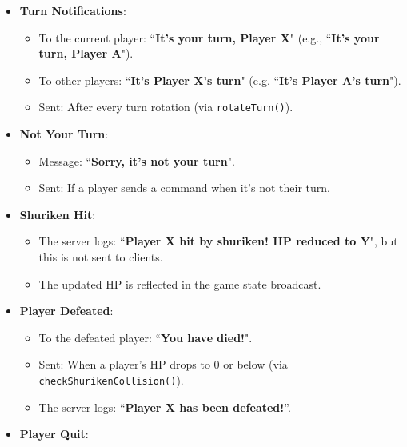 \documentclass{article}
\begin{document}
\begin{enumerate}
\begin {itemize}
\begin{itemize}
\begin{verbatim}
ACTIVE PLAYER INFO (IF EXISTS)
Player 0
Player position: (0, 0)
Player health points 100
Player 1
Player position: (1, 0)
Player health points 100
\end{verbatim}
            \end{itemize}
            \item \textbf{Turn Notifications}:
                \begin{itemize}
                    \item To the current player: ``\textbf{It's your turn, Player X}" (e.g., ``\textbf{It's your turn, Player A}").
                    \item To other players: ``\textbf{It's Player X's turn}" (e.g. ``\textbf{It's Player A's turn}").
                    \item Sent: After every turn rotation (via \texttt{rotateTurn()}).
                \end{itemize}
            \item \textbf{Not Your Turn}:
                \begin{itemize}
                    \item Message: ``\textbf{Sorry, it's not your turn}".
                    \item Sent: If a player sends a command when it's not their turn.
                \end{itemize}
            \item \textbf{Shuriken Hit}:
                \begin{itemize}
                    \item The server logs: ``\textbf{Player X hit by shuriken! HP reduced to Y}", but this is not sent to clients.
                    \item The updated HP is reflected in the game state broadcast.
                \end{itemize}
            \item \textbf{Player Defeated}:
                \begin{itemize}
                    \item To the defeated player: ``\textbf{You have died!}".
                    \item Sent: When a player's HP drops to 0 or below (via \texttt{checkShurikenCollision()}).
                    \item The server logs: ``\textbf{Player X has been defeated!}''.
                \end{itemize}
            \item \textbf{Player Quit}:

\end{itemize}
\end{enumerate}
\end{document}
